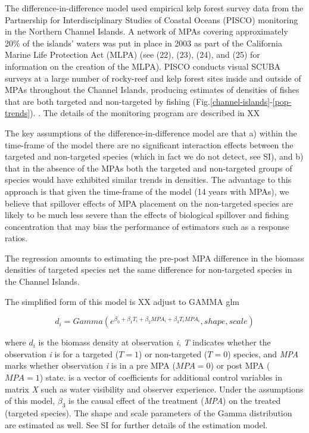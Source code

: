 \documentclass[9pt,twocolumn,twoside,lineno]{pnas-new}
\begin{document}
The difference-in-difference model used empirical kelp forest survey
data from the Partnership for Interdisciplinary Studies of Coastal
Oceans (PISCO) monitoring in the Northern Channel Islands. A network of
MPAs covering approximately 20\% of the islands' waters was put in place
in 2003 as part of the California Marine Life Protection Act (MLPA) (see
(22), (23), (24), and (25) for information on the creation of the MLPA).
PISCO conducts visual SCUBA surveys at a large number of rocky-reef and
kelp forest sites inside and outside of MPAs throughout the Channel
Islands, producing estimates of densities of fishes that are both
targeted and non-targeted by fishing
(Fig.\ref{channel-islands}-\ref{pop-trends}). . The details of the
monitoring program are described in XX

The key assumptions of the difference-in-difference model are that a)
within the time-frame of the model there are no significant interaction
effects between the targeted and non-targeted species (which in fact we
do not detect, see SI), and b) that in the absence of the MPAs both the
targeted and non-targeted groups of species would have exhibited similar
trends in densities. The advantage to this approach is that given the
time-frame of the model (14 years with MPAs), we believe that spillover
effects of MPA placement on the non-targeted species are likely to be
much less severe than the effects of biological spillover and fishing
concentration that may bias the performance of estimators such as a
response ratios.

The regression amounts to estimating the pre-post MPA difference in the
biomass densities of targeted species net the same difference for
non-targeted species in the Channel Islands.

The simplified form of this model is XX adjust to GAMMA glm

\begin{equation}
  d_{i} = Gamma(e^{\beta_0 + \beta_1T_{i} +  \beta_2MPA_{i} + \beta_{3}T_iMPA_i},shape, scale)
\label{eq:did}
\end{equation}

where \(d_i\) is the biomass density at observation \emph{i}, \emph{T}
indicates whether the observation \emph{i} is for a targeted (\(T = 1\))
or non-targeted (\(T = 0\)) species, and \emph{MPA} marks whether
observation \emph{i} is in a pre MPA (\(MPA = 0\)) or post MPA
(\(MPA = 1\)) state. is a vector of coefficients for additional control
variables in matrix \emph{X} such as water visibility and observer
experience. Under the assumptions of this model, \(\beta_3\) is the
causal effect of the treatment (\emph{MPA}) on the treated (targeted
species). The shape and scale parameters of the Gamma distribution are
estimated as well. See SI for further details of the estimation model.
\end{document}
